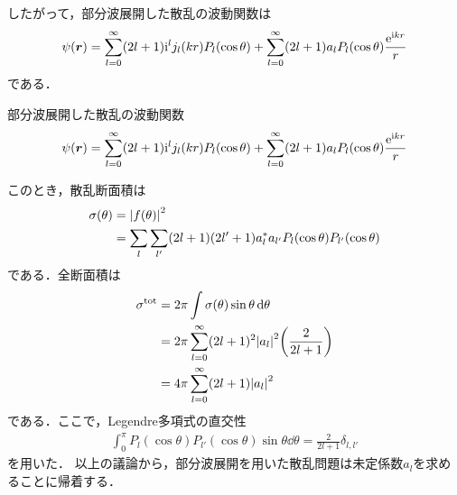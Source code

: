 \documentclass{report}
\begin{document}
  したがって，部分波展開した散乱の波動関数は
  \begin{align}
    \psi(\bm{r}) = \sum_{l = 0}^{\infty} (2l + 1)\mathrm{i}^l j_l(kr)P_l(\cos\theta) + \sum_{l = 0}^{\infty} (2l + 1)a_l P_l(\cos\theta) \frac{\mathrm{e}^{\mathrm{i} kr}}{r}
  \end{align}
  である．
  \begin{itembox}[l]{部分波展開した散乱の波動関数}
  \begin{align}
    \psi(\bm{r}) = \sum_{l = 0}^{\infty} (2l + 1)\mathrm{i}^l j_l(kr)P_l(\cos\theta) + \sum_{l = 0}^{\infty} (2l + 1)a_l P_l(\cos\theta) \frac{\mathrm{e}^{\mathrm{i} kr}}{r}\label{PartialWave}
  \end{align}
  \end{itembox}
  このとき，散乱断面積は
  \begin{align}
    \sigma(\theta) &= \abs{f(\theta)}^2 \\
    &= \sum_{l} \sum_{l'} (2l+1)(2l'+1) a_l^{*}a_{l'} P_l(\cos\theta) P_{l'}(\cos\theta)
  \end{align}
  である．全断面積は
  \begin{align}
    \sigma^{\mathrm{tot}} &= 2\pi \int \sigma(\theta) \sin\theta \dd{\theta} \\
    &= 2\pi \sum_{l=0}^{\infty} (2l+1)^2\abs{a_l}^2\qty(\frac{2}{2l+1}) \\
    &= 4\pi \sum_{l=0}^{\infty} (2l+1) \abs{a_l}^2
  \end{align}
  である．ここで，Legendre多項式の直交性
  \begin{align}
    \int_{0}^{\pi} P_l(\cos\theta)P_{l'}(\cos\theta) \sin\theta \dd{\theta} = \frac{2}{2l+1}\delta_{l,l'}
  \end{align}
  を用いた．
  以上の議論から，部分波展開を用いた散乱問題は未定係数$a_l$を求めることに帰着する．
\end{document}
